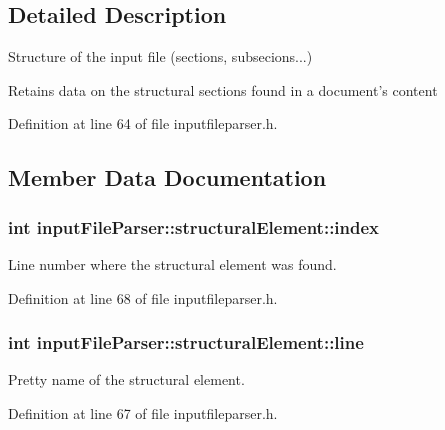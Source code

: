 \subsection{Detailed Description}
Structure of the input file (sections, subsecions...) 

Retains data on the structural sections found in a document's content 

Definition at line 64 of file inputfileparser.\+h.



\subsection{Member Data Documentation}
\hypertarget{structinput_file_parser_1_1structural_element_ab6668b6a416e6f849c8cf4e106531d87}{
\subsubsection[{index}]{\setlength{\rightskip}{0pt plus 5cm}int input\+File\+Parser\+::structural\+Element\+::index}}\label{structinput_file_parser_1_1structural_element_ab6668b6a416e6f849c8cf4e106531d87}


Line number where the structural element was found. 



Definition at line 68 of file inputfileparser.\+h.

\hypertarget{structinput_file_parser_1_1structural_element_a6e9e6f37052a07118e9fd21bc1563714}{
\subsubsection[{line}]{\setlength{\rightskip}{0pt plus 5cm}int input\+File\+Parser\+::structural\+Element\+::line}}\label{structinput_file_parser_1_1structural_element_a6e9e6f37052a07118e9fd21bc1563714}


Pretty name of the structural element. 



Definition at line 67 of file inputfileparser.\+h.

